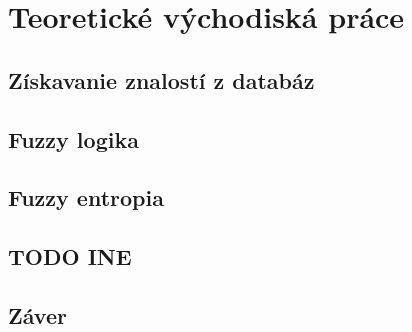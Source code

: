 \chapter{Teoretické východiská práce} 

\section{Získavanie znalostí z databáz }

\section{Fuzzy logika }

\section{Fuzzy entropia}

\section{TODO INE }

\section{Záver}